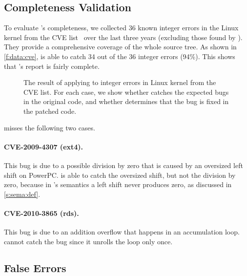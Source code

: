 \subsection{Completeness Validation}
\label{s:eval:complete}

To evaluate \sys's completeness, we collected 36 known integer errors in the
Linux kernel from the CVE list~\cite{cve} over the last three years (excluding
those found by \sys).  They provide a comprehensive coverage of the whole source
tree. 
%
As shown in \autoref{f:data:cve}, 
\sys is able to catch 34 out of the 36 integer errors (94\%).
This shows that \sys's report is fairly complete.

\begin{figure}
\centering
\footnotesize

\caption{The result of applying \sys to integer errors in Linux
kernel from the CVE list.  For each case, we show whether \sys
catches the expected bugs in the original code, and whether \sys
determines that the bug is fixed in the patched code.}
\label{f:data:cve}
\end{figure}

\sys misses the following two cases.

\paragraph{CVE-2009-4307 (ext4).}
This bug is due to a possible division by zero that is caused by
an oversized left shift on PowerPC\@.  \sys is able to catch the
oversized shift, but not the division by zero, because in \sys's
semantics a left shift never produces zero, as discussed in
\autoref{s:sema:def}.

\paragraph{CVE-2010-3865 (rds).}
This bug is due to an addition overflow that happens in an accumulation
loop.  \sys cannot catch the bug since it unrolls the loop only
once.

\subsection{False Errors}


